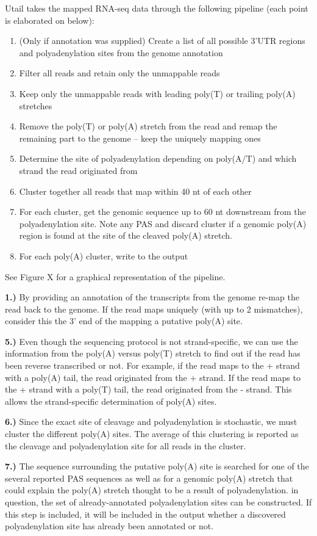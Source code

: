 Utail takes the mapped RNA-seq data through the following pipeline (each point
is elaborated on below):
\begin{enumerate}
	\item (Only if annotation was supplied) Create a list of all possible
		3'UTR regions and polyadenylation sites from the genome annotation
	\item Filter all reads and retain only the unmappable reads
	\item Keep only the unmappable reads with leading poly(T) or trailing
		poly(A) stretches
	\item Remove the poly(T) or poly(A) stretch from the read and remap the
		remaining part to the genome -- keep the uniquely mapping ones
	\item Determine the site of polyadenylation depending on poly(A/T) and which
		strand the read originated from
	\item Cluster together all reads that map within 40 nt of each other
	\item For each cluster, get the genomic sequence up to 60 nt downstream
		from the polyadenylation site. Note any PAS and discard cluster if a
		genomic poly(A) region is found at the site of the cleaved poly(A)
		stretch.
	\item For each poly(A) cluster, write to the output
\end{enumerate}
See Figure X for a graphical representation of the pipeline.

\textbf{1.)} By providing an annotation of the transcripts from the genome
re-map the read back to the genome. If the read maps uniquely (with up to 2
mismatches), consider this the 3' end of the mapping a putative poly(A) site.

\textbf{5.)} Even though the sequencing protocol is not strand-specific, we can
use the information from the poly(A) versus poly(T) stretch to find out if the
read has been reverse transcribed or not. For example, if the read maps to the
+ strand with a poly(A) tail, the read originated from the + strand. If the
read maps to the + strand with a poly(T) tail, the read originated from the -
strand. This allows the strand-specific determination of poly(A) sites.

\textbf{6.)} Since the exact site of cleavage and polyadenylation is stochastic,
we must cluster the different poly(A) sites. The average of this clustering is
reported as the cleavage and polyadenylation site for all reads in the cluster.

\textbf{7.)} The sequence surrounding the putative poly(A) site is searched for
one of the several reported PAS sequences as well as for a genomic poly(A)
stretch that could explain the poly(A) stretch thought to be a result of
polyadenylation. in
question, the set of already-annotated polyadenylation sites can be
constructed. If this step is included, it will be included in the output
whether a discovered polyadenylation site has already been annotated or not.


